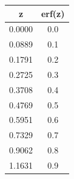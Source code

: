 \begin{table}[H]
\centering
\begin{tabular}{|c|c|}
\hline
z      & erf(z) \\ \hline
0.0000 & 0.0    \\ \hline
0.0889 & 0.1    \\ \hline
0.1791 & 0.2    \\ \hline
0.2725 & 0.3    \\ \hline
0.3708 & 0.4    \\ \hline
0.4769 & 0.5    \\ \hline
0.5951 & 0.6    \\ \hline
0.7329 & 0.7    \\ \hline
0.9062 & 0.8    \\ \hline
1.1631 & 0.9    \\ \hline
\end{tabular}
\end{table}